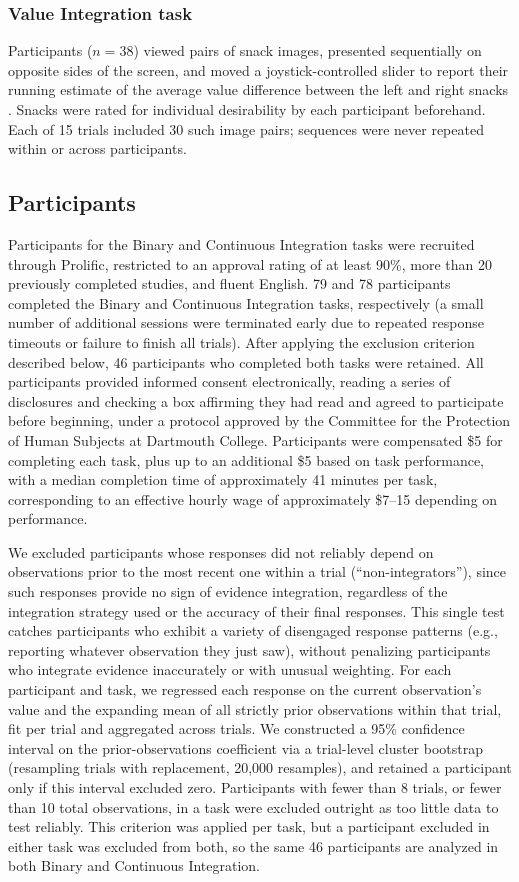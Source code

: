 \documentclass[12pt]{article}
\begin{document}
\subsubsection*{Value Integration task}
Participants ($n=38$) viewed pairs of snack images, presented sequentially on opposite sides of the screen, and moved a joystick-controlled slider to report their running estimate of the average value difference between the left and right snacks \cite{yoo2025people}. Snacks were rated for individual desirability by each participant beforehand. Each of 15 trials included 30 such image pairs; sequences were never repeated within or across participants.

\subsection{Participants}
Participants for the Binary and Continuous Integration tasks were recruited through Prolific, restricted to an approval rating of at least 90\%, more than 20 previously completed studies, and fluent English. 79 and 78 participants completed the Binary and Continuous Integration tasks, respectively (a small number of additional sessions were terminated early due to repeated response timeouts or failure to finish all trials). After applying the exclusion criterion described below, 46 participants who completed both tasks were retained. All participants provided informed consent electronically, reading a series of disclosures and checking a box affirming they had read and agreed to participate before beginning, under a protocol approved by the Committee for the Protection of Human Subjects at Dartmouth College. Participants were compensated \$5 for completing each task, plus up to an additional \$5 based on task performance, with a median completion time of approximately 41 minutes per task, corresponding to an effective hourly wage of approximately \$7--15 depending on performance.

We excluded participants whose responses did not reliably depend on observations prior to the most recent one within a trial (``non-integrators''), since such responses provide no sign of evidence integration, regardless of the integration strategy used or the accuracy of their final responses. This single test catches participants who exhibit a variety of disengaged response patterns (e.g., reporting whatever observation they just saw), without penalizing participants who integrate evidence inaccurately or with unusual weighting. For each participant and task, we regressed each response on the current observation's value and the expanding mean of all strictly prior observations within that trial, fit per trial and aggregated across trials. We constructed a 95\% confidence interval on the prior-observations coefficient via a trial-level cluster bootstrap (resampling trials with replacement, 20,000 resamples), and retained a participant only if this interval excluded zero. Participants with fewer than 8 trials, or fewer than 10 total observations, in a task were excluded outright as too little data to test reliably. This criterion was applied per task, but a participant excluded in either task was excluded from both, so the same 46 participants are analyzed in both Binary and Continuous Integration.
\end{document}

